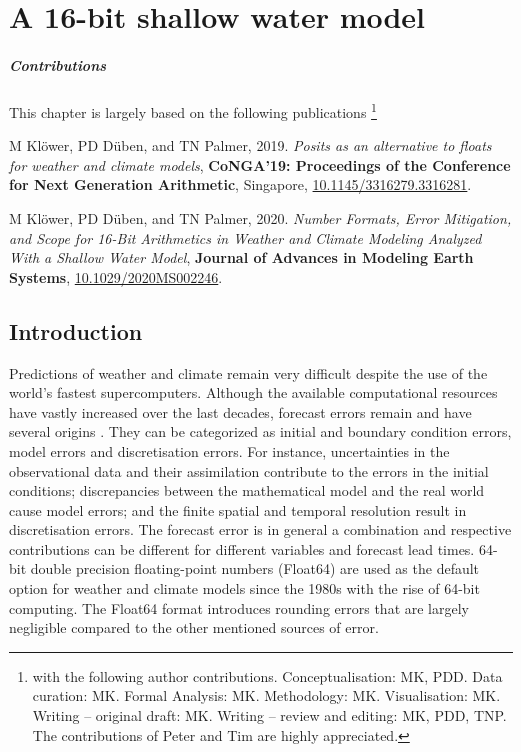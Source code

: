\chapter{A 16-bit shallow water model}
\label{chap:shallow_water}

\small \paragraph{Contributions} This chapter is largely based on the following publications \footnote{with the following author contributions.
Conceptualisation: MK, PDD. Data curation: MK. Formal Analysis: MK. Methodology: MK. Visualisation: MK. Writing – original draft:
MK. Writing – review and editing: MK, PDD, TNP. The contributions of Peter and Tim are highly appreciated.}

\vspace{\baselineskip}
\indent M Klöwer, PD Düben, and TN Palmer, 2019. \emph{Posits as an alternative to floats for weather and climate models},
\textbf{CoNGA'19: Proceedings of the Conference for Next Generation Arithmetic}, Singapore,
\href{https://doi.org/10.1145/3316279.3316281}{10.1145/3316279.3316281}.

\indent M Klöwer, PD Düben, and TN Palmer, 2020. \emph{Number Formats, Error Mitigation, and Scope for 16-Bit Arithmetics
in Weather and Climate Modeling Analyzed With a Shallow Water Model}, \textbf{Journal of Advances in Modeling Earth Systems},
\href{https://doi.org/10.1029/2020MS002246}{10.1029/2020MS002246}.
\vspace{\baselineskip}
\normalsize

\section{Introduction}

Predictions of weather and climate remain very difficult despite the use of the
world's fastest supercomputers. Although the available computational resources
have vastly increased over the last decades, forecast errors remain and have
several origins \citep{Palmer2012,Palmer2015}. They can be categorized as
initial and boundary condition errors, model errors and discretisation errors.
For instance, uncertainties in the observational data and their
assimilation contribute to the errors in the initial conditions; discrepancies
between the mathematical model and the real world cause model errors; and the finite
spatial and temporal resolution result in discretisation errors. The forecast error
is in general a combination and respective contributions can be different for
different variables and forecast lead times. 64-bit double precision floating-point
numbers (Float64) are used as the default option for weather and climate models since
the 1980s with the rise of 64-bit computing. The Float64 format introduces rounding errors
that are largely negligible compared to the other mentioned sources of error.

